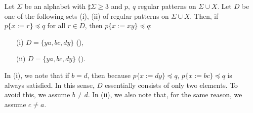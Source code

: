 \begin{lem}\label{lem:oneside}
Let $\Sigma$ be an alphabet with $\sharp\Sigma \ge 3$ and $p,~q$ regular patterns on $\Sigma\cup X$.
Let $D$ be one of the following sets \textrm{(i), (ii)} of regular patterns on $\Sigma\cup X$.
Then, if $p \{ x := r \} \preceq q$ for all $r \in D$, then $p \{ x := xy \} \preceq q$:
\begin{enumerate}
\item[{\rm (i)}] $D=\{ ya, bc, dy \}$ (\TheConditionB),
\item[{\rm (ii)}] $D=\{ ya, bc, dy \}$ (\TheConditionC).
\end{enumerate}
\end{lem}

In {\rm (i)}, we note that if $b = d$, then because $p\{x:=dy\}\preceq q$, $p\{x:=bc\}\preceq q$ is always satisfied. In this sense, $D$ essentially consists of only two elements. To avoid this, we assume $b \not= d$. In {\rm (ii)}, we also note that, for the same reason, we assume $c\not= a$. 

\medskip

